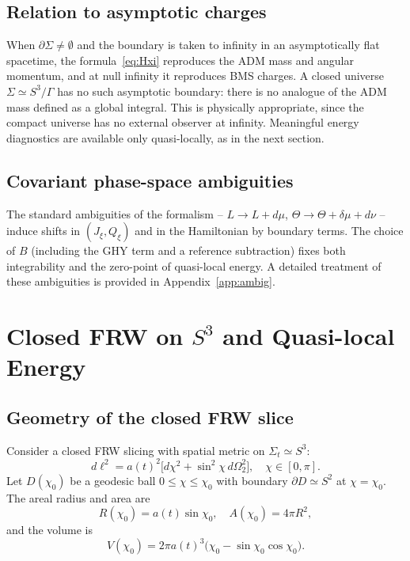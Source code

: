 \documentclass[12pt,a4paper]{article}
\newcommand{\Sig}{\Sigma}           %
\newcommand{\pa}{\partial}          %
\newcommand{\Jxi}{J_\xi}
\newcommand{\Qxi}{Q_\xi}
\begin{document}
\subsection{Relation to asymptotic charges}

When $\pa\Sig \neq \emptyset$ and the boundary is taken
to infinity in an asymptotically flat spacetime, the
formula~\eqref{eq:Hxi} reproduces the ADM mass and
angular momentum, and at null infinity it reproduces BMS
charges. A closed universe $\Sig \simeq S^3/\Gamma$ has
no such asymptotic boundary: there is no analogue of the
ADM mass defined as a global integral. This is physically
appropriate, since the compact universe has no external
observer at infinity. Meaningful energy diagnostics are
available only quasi-locally, as in the next section.

\subsection{Covariant phase-space ambiguities}

The standard ambiguities of the formalism -- $L \to L +
d\mu$, $\Theta \to \Theta + \delta\mu + d\nu$ -- induce
shifts in $(\Jxi, \Qxi)$ and in the Hamiltonian by
boundary terms. The choice of $B$ (including the GHY term
and a reference subtraction) fixes both integrability and
the zero-point of quasi-local energy. A detailed treatment
of these ambiguities is provided in Appendix~\ref{app:ambig}.

\section{Closed FRW on $S^3$ and Quasi-local Energy}
\label{sec:frw}

\subsection{Geometry of the closed FRW slice}

Consider a closed FRW slicing with spatial metric on
$\Sig_t \simeq S^3$:
\begin{equation}
  d\ell^2 = a(t)^2\bigl[d\chi^2 + \sin^2\chi\,d\Omega_2^2\bigr],
  \quad \chi\in[0,\pi].
  \label{eq:S3metric}
\end{equation}
Let $D(\chi_0)$ be a geodesic ball $0\leq\chi\leq\chi_0$
with boundary $\pa D \simeq S^2$ at $\chi = \chi_0$.
The areal radius and area are
\begin{equation}
  R(\chi_0) = a(t)\sin\chi_0, \quad A(\chi_0) = 4\pi R^2,
  \label{eq:areal}
\end{equation}
and the volume is
\begin{equation}
  V(\chi_0) = 2\pi a(t)^3\bigl(\chi_0 - \sin\chi_0\cos\chi_0\bigr).
  \label{eq:vol}
\end{equation}
\end{document}

